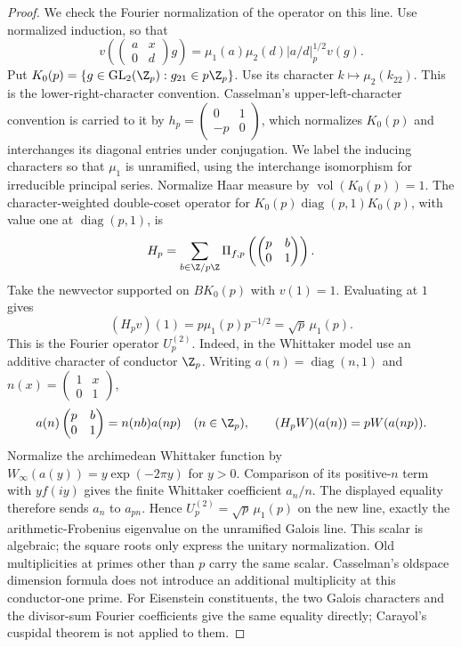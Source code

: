 \begin{proof}
We check the Fourier normalization of the operator on this line.
Use normalized induction, so that
\[
 v\left(\begin{pmatrix}a&x\\0&d\end{pmatrix}g\right)
 =\mu_1(a)\mu_2(d)|a/d|_p^{1/2}v(g).
\]
Put $K_0(p)=\{g\in\mathrm{GL}_2(\Z_p):g_{21}\in p\Z_p\}$.
Use its character $k\mapsto\mu_2(k_{22})$.
This is the lower-right-character convention. Casselman's
upper-left-character convention is carried to it by
$h_p=\left(\begin{smallmatrix}0&1\\-p&0\end{smallmatrix}\right)$,
which normalizes $K_0(p)$ and interchanges its diagonal entries
under conjugation. We label the inducing characters so that
$\mu_1$ is unramified, using the interchange isomorphism for
irreducible principal series.
Normalize Haar measure by $\operatorname{vol}(K_0(p))=1$.
The character-weighted double-coset operator for
$K_0(p)\operatorname{diag}(p,1)K_0(p)$, with value one at
$\operatorname{diag}(p,1)$, is
\[
 H_p=\sum_{b\in\Z/p\Z}
       \Pi_{f,p}\left(\begin{pmatrix}p&b\\0&1\end{pmatrix}\right).
\]
Take the newvector supported on $B K_0(p)$ with $v(1)=1$.
Evaluating at $1$ gives
\[
 (H_pv)(1)=p\mu_1(p)p^{-1/2}=\sqrt p\,\mu_1(p).
\]
This is the Fourier operator $U_p^{(2)}$. Indeed, in the
Whittaker model use an additive character of conductor $\Z_p$.
Writing $a(n)=\operatorname{diag}(n,1)$ and
$n(x)=\left(\begin{smallmatrix}1&x\\0&1\end{smallmatrix}\right)$,
\[
 a(n)\begin{pmatrix}p&b\\0&1\end{pmatrix}=n(nb)a(np)
 \quad(n\in\Z_p),\qquad
 (H_pW)(a(n))=pW(a(np)).
\]
Normalize the archimedean Whittaker function by
$W_\infty(a(y))=y\exp(-2\pi y)$ for $y>0$.
Comparison of its positive-$n$ term with $y f(iy)$ gives the
finite Whittaker coefficient $a_n/n$. The displayed equality
therefore sends $a_n$ to $a_{pn}$. Hence
$U_p^{(2)}=\sqrt p\,\mu_1(p)$ on the new line, exactly the
arithmetic-Frobenius eigenvalue on the unramified Galois line.
This scalar is algebraic; the square roots only express the
unitary normalization. Old multiplicities at primes other than
$p$ carry the same scalar. Casselman's oldspace dimension formula
\cite[Corollary, p.~306, and Theorem~4, p.~313]{casselman}
does not introduce an additional multiplicity at this conductor-one
prime. For Eisenstein constituents, the two Galois characters and
the divisor-sum Fourier coefficients give the same equality directly;
Carayol's cuspidal theorem is not applied to them.


\end{proof}
